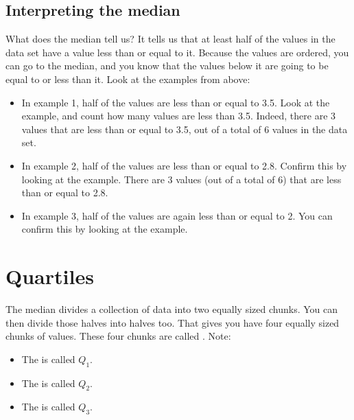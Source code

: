 \documentclass[../../../main.tex]{subfiles}
\begin{document}
\subsection{Interpreting the median}

What does the median tell us? It tells us that at least half of the values in the data set have a value less than or equal to it. Because the values are ordered, you can go to the median, and you know that the values below it are going to be equal to or less than it. Look at the examples from above:

\begin{itemize}
  \item In example 1, half of the values are less than or equal to 3.5. Look at the example, and count how many values are less than 3.5. Indeed, there are 3 values that are less than or equal to 3.5, out of a total of 6 values in the data set.
  
  \item In example 2, half of the values are less than or equal to 2.8. Confirm this by looking at the example. There are 3 values (out of a total of 6) that are less than or equal to 2.8.
  
  \item In example 3, half of the values are again less than or equal to 2. You can confirm this by looking at the example.

\end{itemize}


\section{Quartiles}


The median divides a collection of data into two equally sized chunks. You can then divide those halves into halves too. That gives you have four equally sized chunks of values. These four chunks are called . Note:

\begin{itemize}
  \item The  is called $Q_{1}$. 
  \item The  is called $Q_{2}$. 
  \item The  is called $Q_{3}$. 
\end{itemize}


\end{document}

